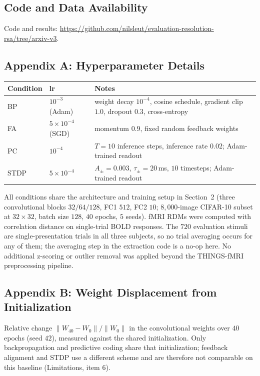 \documentclass[10pt,twocolumn]{article}
\providecommand{\DIFaddbegin}{} %
\providecommand{\DIFaddend}{} %
\providecommand{\DIFdelbegin}{} %
\providecommand{\DIFdelend}{} %
\providecommand{\DIFscaledelfig}{0.5}
\newlength{\DIFdelgraphicswidth} %
\newlength{\DIFdelgraphicsheight} %
\providecommand{\DIFaddincludegraphics}[2][]{{\color{blue}\fbox{\DIFOincludegraphics[#1]{#2}}}} %
\providecommand{\DIFdelincludegraphics}[2][]{%
\sbox{\DIFdelgraphicsbox}{\DIFOincludegraphics[#1]{#2}}%
\settoboxwidth{\DIFdelgraphicswidth}{\DIFdelgraphicsbox} %
\settoboxtotalheight{\DIFdelgraphicsheight}{\DIFdelgraphicsbox} %
\scalebox{\DIFscaledelfig}{%
\parbox[b]{\DIFdelgraphicswidth}{\usebox{\DIFdelgraphicsbox}\\[-\baselineskip] \rule{\DIFdelgraphicswidth}{0em}}\llap{\resizebox{\DIFdelgraphicswidth}{\DIFdelgraphicsheight}{%
\setlength{\unitlength}{\DIFdelgraphicswidth}%
\begin{picture}(1,1)%
\thicklines\linethickness{2pt} %
{\color[rgb]{1,0,0}\put(0,0){\framebox(1,1){}}}%
{\color[rgb]{1,0,0}\put(0,0){\line( 1,1){1}}}%
{\color[rgb]{1,0,0}\put(0,1){\line(1,-1){1}}}%
\end{picture}%
}\hspace*{3pt}}} %
} %
\DeclareRobustCommand{\DIFaddbegin}{\DIFOaddbegin \let\includegraphics\DIFaddincludegraphics} %
\DeclareRobustCommand{\DIFaddend}{\DIFOaddend \let\includegraphics\DIFOincludegraphics} %
\DeclareRobustCommand{\DIFdelbegin}{\DIFOdelbegin \let\includegraphics\DIFdelincludegraphics} %
\DeclareRobustCommand{\DIFdelend}{\DIFOaddend \let\includegraphics\DIFOincludegraphics} %
\begin{document}
\subsection*{Code and Data Availability}
Code and results: \DIFdelbegin %
\DIFdelend \DIFaddbegin \url{https://github.com/nilsleut/evaluation-resolution-rsa/tree/arxiv-v3}\DIFaddend .

\subsection*{Appendix A: Hyperparameter Details}
\begingroup
\footnotesize
\begin{tabular}{@{}llp{3.3cm}@{}}
\toprule
Condition & lr & Notes \\
\midrule
BP & $10^{-3}$ (Adam) & weight decay $10^{-4}$, cosine schedule, gradient clip $1.0$, dropout $0.3$, cross-entropy \\
FA & $5\times10^{-4}$ (SGD) & momentum $0.9$, fixed random feedback weights \\
PC & $10^{-4}$ & $T=10$ inference steps, inference rate $0.02$; Adam-trained readout \\
STDP & $5\times10^{-4}$ & $A_\pm=0.003$, $\tau_\pm=20$\,ms, $10$ timesteps; Adam-trained readout \\
\bottomrule
\end{tabular}
\endgroup

\noindent All conditions share the architecture and training setup in Section~2 (three convolutional blocks $32/64/128$, FC1 $512$, FC2 $10$; $8{,}000$-image CIFAR-10 subset at $32\times32$, batch size $128$, $40$ epochs, $5$ seeds). fMRI RDMs were computed with correlation distance on single-trial BOLD responses. The $720$ evaluation stimuli are single-presentation trials in all three subjects, so no trial averaging occurs for any of them; the averaging step in the extraction code is a no-op here. No additional z-scoring or outlier removal was applied beyond the THINGS-fMRI preprocessing pipeline.

\subsection*{Appendix B: Weight Displacement from Initialization}

\noindent Relative change $\lVert W_{40} - W_{0}\rVert / \lVert W_{0}\rVert$ in the convolutional weights over $40$ epochs (seed $42$), measured against the shared initialization. Only backpropagation and predictive coding share that initialization; feedback alignment and STDP use a different scheme and are therefore not comparable on this baseline (Limitations, item 6).
\end{document}
